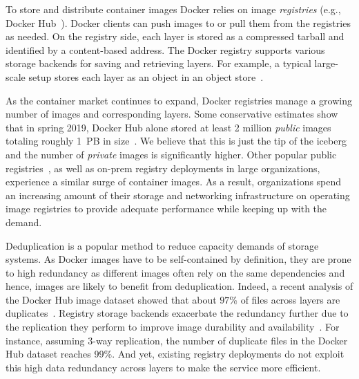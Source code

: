 To store and distribute container images Docker relies on image
\emph{registries} (e.g., Docker Hub~\cite{docker-hub}).
%
Docker clients can push images to or pull them from the registries as needed.
%
On the registry side, each layer is stored as a compressed tarball and
identified by a content-based address.
%
The Docker registry supports various storage backends for saving and retrieving
layers. For example, a typical large-scale setup stores each layer as an object in an
object store~\cite{s3,swift}.

As the container market continues to expand, Docker registries manage a
growing number of images and corresponding layers.
%
Some conservative estimates show that in spring 2019, Docker Hub alone
stored at least 2 million \emph{public} images totaling roughly 1~PB in
size~\cite{skourtis2019carving,dedupanalysis}. 
%
We believe that this is just the tip of the iceberg and the number of
\emph{private} images is significantly higher.
%
Other popular public
registries~\cite{amazon-ecr,jfrog-artifactory,azure-cr,google-cr}, as well as
on-prem registry deployments in large organizations, experience a similar
surge of container images.
%
As a result,
organizations spend an increasing amount of their storage and networking
infrastructure on operating image registries to provide adequate performance while keeping up with the demand.
%
%

Deduplication is a popular method to reduce capacity demands of storage systems.
%
As Docker images have to be self-contained by definition, they are prone to high
redundancy as different images often rely on the same dependencies and hence,
images are likely to benefit from deduplication.
%
Indeed, a recent analysis of the
Docker Hub image dataset showed that about $97$\% of files across layers are
duplicates~\cite{dedupanalysis}.
%
%
Registry storage backends exacerbate the redundancy further due to the
replication they perform to improve image durability and
availability~\cite{Bonvin:2010:SFS:1807128.1807162}.
%
For instance, assuming 3-way replication, the number of duplicate files in the
Docker Hub dataset reaches 99\%.
%
And yet, existing registry deployments do not exploit this high data redundancy
across layers to make the service more efficient.

